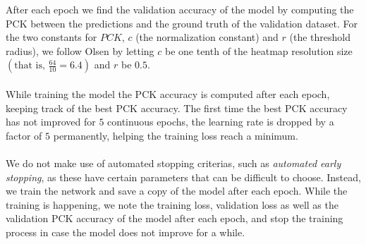 \documentclass[./main.tex]{subfiles}
\begin{document}
After each epoch we find the validation accuracy of the model by computing the PCK between the predictions and the ground truth of the validation dataset.  For the two constants for $PCK$, $c$ (the normalization constant) and $r$ (the threshold radius), we follow Olsen \cite{Camilla} by letting $c$ be one tenth of the heatmap resolution size $\left(\text{that is, }\frac{64}{10} = 6.4 \right)$ and $r$ be $0.5$.
\\
\\
While training the model the PCK accuracy is computed after each epoch, keeping track of the best PCK accuracy. The first time the best PCK accuracy has not improved for $5$ continuous epochs, the learning rate is dropped by a factor of $5$ permanently, helping the training loss reach a minimum.
\\
\\
We do not make use of automated stopping criterias, such as \textit{automated early stopping}, as these have certain parameters that can be difficult to choose. Instead, we train the network and save a copy of the model after each epoch. While the training is happening, we note the training loss, validation loss as well as the validation PCK accuracy of the model after each epoch, and stop the training process in case the model does not improve for a while.
\end{document}
